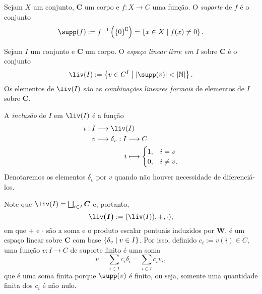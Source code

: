 \begin{defi}
Sejam $X$ um conjunto, $\bm C$ um corpo e $f: X \to C$ uma função. O \emph{suporte} de $f$ é o conjunto
	\begin{equation*}
	\supp(f) := f\inv\left(\{0\}^\complement\right) = \set{x \in X}{f(x) \neq 0}.
	\end{equation*}
\end{defi}


\begin{defi} Sejam $I$ um conjunto e $\bm C$ um corpo. O \emph{espaço linear livre em $I$} sobre $\bm C$ é o conjunto 
	\begin{equation*}
	\liv(I) := \set{v \in C^I}{\card{\supp(v)}<\card{\N}}.
	\end{equation*}
Os elementos de $\liv(I)$ são as \emph{combinações lineares formais} de elementos de $I$ sobre $\bm C$.

A \emph{inclusão} de $I$ em $\liv(I)$ é a função
	\begin{align*}
	\func{\iota}{I}{\liv(I)}{v}{
		\begin{aligned}[t]
		\func{\delta_v}{I}{C}{i}{\begin{cases}
							1,& i = v \\
							0,& i \neq v.
						\end{cases}}
		\end{aligned}	
	}
	\end{align*}
Denotaremos os elementos $\delta_v$ por $v$ quando não houver necessidade de diferenciá-los.
\end{defi}

Note que $\liv(I) = \coprod_{i \in I} \bm C$ e, portanto,
	\begin{equation*}
	\bm{\liv(I)} := (\liv(I)),+,\cdot),
	\end{equation*}	
em que $+$ e $\cdot$ são a soma e o produto escalar pontuais induzidos por $\bm W$, é um espaço linear sobre $\bm C$ com base $\left\{\delta_v \;\middle\vert\; v \in I \right\}$. Por isso, definido $c_i := v(i) \in C$, uma função $v: I \to C$ de suporte finito é uma soma
	\begin{equation*}
	v = \sum_{i \in I} c_i \delta_i = \sum_{i \in I} c_i v_i,
	\end{equation*}
que é uma soma finita porque $\supp(v)$ é finito, ou seja, somente uma quantidade finita dos $c_i$ é não nulo.

